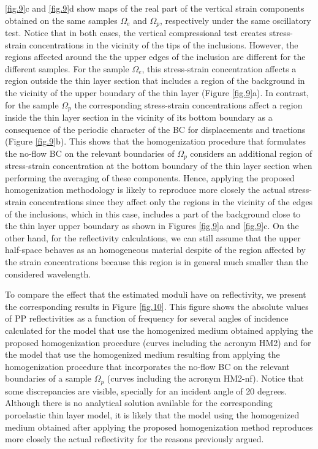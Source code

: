 \documentclass[draft]{agujournal2019}
\begin{document}
 \ref{fig.9}c and \ref{fig.9}d show maps of the real part of the vertical strain components obtained on the same samples  $\Omega_e$ and $\Omega_p$, respectively under the same oscillatory test. Notice that in both cases, the vertical compressional test creates stress-strain concentrations in the vicinity of the tips of the inclusions. However, the regions affected around the the upper edges of the inclusion are different for the different samples. For the sample $\Omega_e$, this stress-strain concentration affects a region outside the thin layer section that includes a region of the  background in the vicinity of the upper boundary of the thin layer (Figure \ref{fig.9}a). In contrast, for the sample $\Omega_p$  the corresponding stress-strain concentrations affect a region inside the thin layer section in the vicinity of its bottom boundary as a consequence of the periodic character of the BC for displacements and tractions (Figure \ref{fig.9}b). This shows that the homogenization procedure that formulates the no-flow BC on the relevant boundaries of $\Omega_p$ considers an additional region of stress-strain concentration at the bottom boundary of the thin layer section when performing the averaging of these components. Hence, applying the proposed homogenization methodology is likely to reproduce more closely the actual stress-strain concentrations since they affect only the regions in the vicinity of the edges of the inclusions, which in this case, includes a part of the background close to the thin layer upper boundary as shown in Figures \ref{fig.9}a and \ref{fig.9}c. On the other hand, for the reflectivity calculations, we can still assume that the upper half-space behaves as an homogeneous material despite of the region affected by the strain concentrations because this region is in general much smaller than the considered wavelength.

To compare the effect that the estimated moduli have on  reflectivity, we present the corresponding results in Figure \ref{fig.10}. This figure shows the absolute values of PP reflectivities as a function of frequency for several angles of incidence calculated for the model that use the homogenized medium obtained applying the proposed homogenization procedure (curves including the acronym HM2) and for the model that  use the homogenized medium resulting from applying the homogenization procedure that incorporates the no-flow BC on the relevant boundaries of a sample $\Omega_p$ (curves including the acronym HM2-nf). Notice that some discrepancies are visible, specially for an incident angle of 20 degrees. Although there is no analytical solution available for the corresponding poroelastic thin layer model, it is likely that the model using the homogenized medium obtained after applying the proposed homogenization method reproduces more closely the actual reflectivity for the reasons previously argued. %
\end{document}
